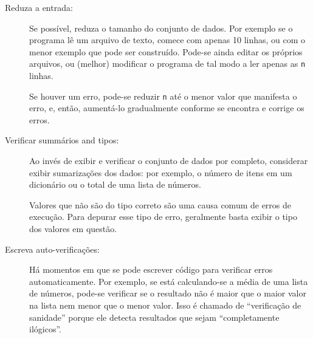 \begin{description}

\item[Reduza a entrada:] Se possível, reduza o tamanho do conjunto de dados.
Por exemplo se o programa lê um arquivo de texto, comece com apenas 10 linhas,
ou com o menor exemplo que pode ser construído. Pode-se ainda editar os próprios arquivos, ou (melhor) modificar o programa de tal modo a ler apenas as {\tt n} linhas.

Se houver um erro, pode-se reduzir {\tt n} até o menor valor que manifesta o erro, e, então, aumentá-lo gradualmente conforme se encontra e corrige os erros.

\item[Verificar summários and tipos:] Ao invés de exibir e verificar o conjunto de dados por completo, considerar exibir sumarizações dos dados: por exemplo, o número de itens em um dicionário ou o total de uma lista de números.

Valores que não são do tipo correto são uma causa comum de erros de execução.
Para depurar esse tipo de erro, geralmente basta exibir o tipo dos valores em questão.

\item[Escreva auto-verificações:] Há momentos em que se pode escrever código para verificar erros automaticamente. Por exemplo, se está calculando-se a média de uma lista de números, pode-se verificar se o resultado não é maior que o maior valor na lista nem menor que o menor valor. Isso é chamado de ``verificação de sanidade'' porque ele detecta resultados que sejam ``completamente ilógicos''.


\end{description}

